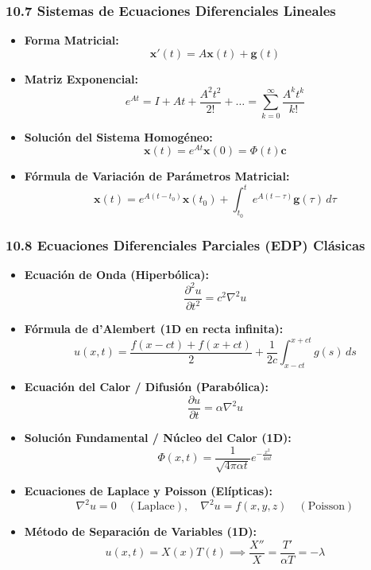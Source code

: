 \documentclass[11pt,a4paper]{article}
\begin{document}
\subsubsection*{10.7 Sistemas de Ecuaciones Diferenciales Lineales}

\begin{itemize}
  \item \textbf{Forma Matricial:}
  \[
    \mathbf{x}'(t) = A\mathbf{x}(t) + \mathbf{g}(t)
  \]
  \item \textbf{Matriz Exponencial:}
  \[
    e^{At} = I + At + \frac{A^2 t^2}{2!} + \dots = \sum_{k=0}^\infty \frac{A^k t^k}{k!}
  \]
  \item \textbf{Solución del Sistema Homogéneo:}
  \[
    \mathbf{x}(t) = e^{At}\mathbf{x}(0) = \Phi(t)\mathbf{c}
  \]
  \item \textbf{Fórmula de Variación de Parámetros Matricial:}
  \[
    \mathbf{x}(t) = e^{A(t - t_0)}\mathbf{x}(t_0) + \int_{t_0}^t e^{A(t - \tau)}\mathbf{g}(\tau) \, d\tau
  \]
\end{itemize}

\subsubsection*{10.8 Ecuaciones Diferenciales Parciales (EDP) Clásicas}

\begin{itemize}
  \item \textbf{Ecuación de Onda (Hiperbólica):}
  \[
    \frac{\partial^2 u}{\partial t^2} = c^2 \nabla^2 u
  \]
  \item \textbf{Fórmula de d'Alembert (1D en recta infinita):}
  \[
    u(x, t) = \frac{f(x - ct) + f(x + ct)}{2} + \frac{1}{2c}\int_{x - ct}^{x + ct} g(s) \, ds
  \]
  \item \textbf{Ecuación del Calor / Difusión (Parabólica):}
  \[
    \frac{\partial u}{\partial t} = \alpha \nabla^2 u
  \]
  \item \textbf{Solución Fundamental / Núcleo del Calor (1D):}
  \[
    \Phi(x, t) = \frac{1}{\sqrt{4\pi \alpha t}} e^{-\frac{x^2}{4\alpha t}}
  \]
  \item \textbf{Ecuaciones de Laplace y Poisson (Elípticas):}
  \[
    \nabla^2 u = 0 \quad (\text{Laplace}), \quad \nabla^2 u = f(x, y, z) \quad (\text{Poisson})
  \]
  \item \textbf{Método de Separación de Variables (1D):}
  \[
    u(x, t) = X(x)T(t) \implies \frac{X''}{X} = \frac{T'}{\alpha T} = -\lambda
  \]
\end{itemize}
\end{document}
